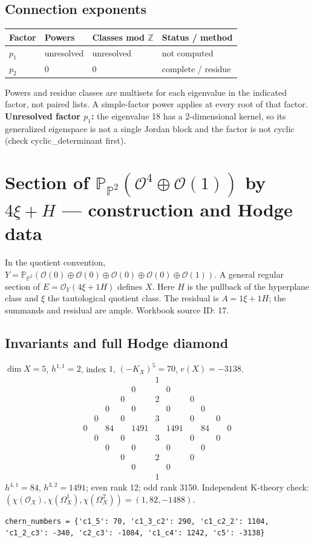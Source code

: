 \documentclass[10pt,a4paper]{article}
\begin{document}
\subsection*{Connection exponents}
\begin{center}\begin{tabular}{llll}\toprule Factor & Powers & Classes mod $\mathbb Z$ & Status / method\\\midrule
$p_{1}$ & unresolved & unresolved & not computed\\
$p_{2}$ & $0$ & $0$ & complete / residue\\
\bottomrule\end{tabular}\end{center}
Powers and residue classes are multisets for each eigenvalue in the indicated factor, not paired lists. A simple-factor power applies at every root of that factor.
\textbf{Unresolved factor $p_{1}$:} the eigenvalue 18 has a 2-dimensional kernel, so its generalized eigenspace is not a single Jordan block and the factor is not cyclic (check cyclic\_determinant first).
\clearpage\section*{Section of $\mathbb P_{\mathbb P^{2}}(\mathcal O^{4}\oplus \mathcal O(1))$ by $4\xi +H$ --- construction and Hodge data}\label{entry:PB5-017}
In the quotient convention, $Y=\mathbb P_{\mathbb P^{2}}(\mathcal O(0)\oplus\mathcal O(0)\oplus\mathcal O(0)\oplus\mathcal O(0)\oplus\mathcal O(1))$.
A general regular section of $E=\mathcal O_Y(4\xi+1H)$ defines $X$.
Here $H$ is the pullback of the hyperplane class and $\xi$ the tautological quotient class. The residual is $A=1\xi+1H$; the summands and residual are ample.
Workbook source ID: 17.
\subsection*{Invariants and full Hodge diamond}
$\dim X=5$, $h^{1,1}=2$, index $1$, $(-K_X)^5=70$, $e(X)=-3138$.
\[\begin{array}{ccccccccccc}&&&&&1&&&&&\\&&&&0&&0&&&&\\&&&0&&2&&0&&&\\&&0&&0&&0&&0&&\\&0&&0&&3&&0&&0&\\0&&84&&1491&&1491&&84&&0\\&0&&0&&3&&0&&0&\\&&0&&0&&0&&0&&\\&&&0&&2&&0&&&\\&&&&0&&0&&&&\\&&&&&1&&&&&\end{array}\]
$h^{4,1}=84$, $h^{3,2}=1491$; even rank 12; odd rank 3150.
Independent K-theory check: $(\chi(\mathcal O_X),\chi(\Omega_X^1),\chi(\Omega_X^2))=(1, 82, -1488)$.
\begin{lstlisting}
chern_numbers = {'c1_5': 70, 'c1_3_c2': 290, 'c1_c2_2': 1104, 'c1_2_c3': -340, 'c2_c3': -1084, 'c1_c4': 1242, 'c5': -3138}
\end{lstlisting}
\end{document}
